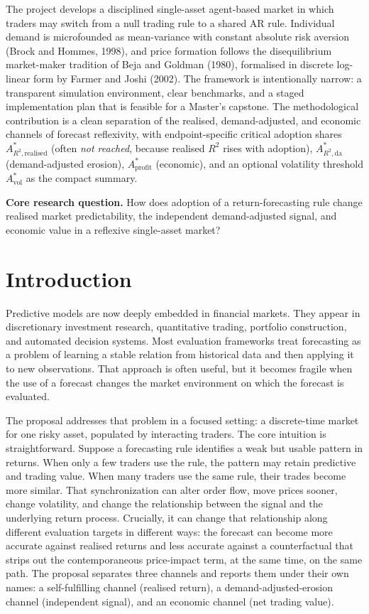 \documentclass[11pt]{article}
\begin{document}
The project develops a disciplined single-asset agent-based market in which traders may switch from a null trading rule to a shared AR rule. Individual demand is microfounded as mean-variance with constant absolute risk aversion (Brock and Hommes, 1998), and price formation follows the disequilibrium market-maker tradition of Beja and Goldman (1980), formalised in discrete log-linear form by Farmer and Joshi (2002). The framework is intentionally narrow: a transparent simulation environment, clear benchmarks, and a staged implementation plan that is feasible for a Master's capstone. The methodological contribution is a clean separation of the realised, demand-adjusted, and economic channels of forecast reflexivity, with endpoint-specific critical adoption shares $A^{*}_{R^{2},\mathrm{realised}}$ (often \emph{not reached}, because realised $R^{2}$ rises with adoption), $A^{*}_{R^{2},\mathrm{da}}$ (demand-adjusted erosion), $A^{*}_{\mathrm{profit}}$ (economic), and an optional volatility threshold $A^{*}_{\mathrm{vol}}$ as the compact summary.

\begin{callout}
\textbf{Core research question.} How does adoption of a return-forecasting rule change realised market predictability, the independent demand-adjusted signal, and economic value in a reflexive single-asset market?
\end{callout}


\section{Introduction}

Predictive models are now deeply embedded in financial markets. They appear in discretionary investment research, quantitative trading, portfolio construction, and automated decision systems. Most evaluation frameworks treat forecasting as a problem of learning a stable relation from historical data and then applying it to new observations. That approach is often useful, but it becomes fragile when the use of a forecast changes the market environment on which the forecast is evaluated.

The proposal addresses that problem in a focused setting: a discrete-time market for one risky asset, populated by interacting traders. The core intuition is straightforward. Suppose a forecasting rule identifies a weak but usable pattern in returns. When only a few traders use the rule, the pattern may retain predictive and trading value. When many traders use the same rule, their trades become more similar. That synchronization can alter order flow, move prices sooner, change volatility, and change the relationship between the signal and the underlying return process. Crucially, it can change that relationship along different evaluation targets in different ways: the forecast can become more accurate against realised returns and less accurate against a counterfactual that strips out the contemporaneous price-impact term, at the same time, on the same path. The proposal separates three channels and reports them under their own names: a self-fulfilling channel (realised return), a demand-adjusted-erosion channel (independent signal), and an economic channel (net trading value).
\end{document}
